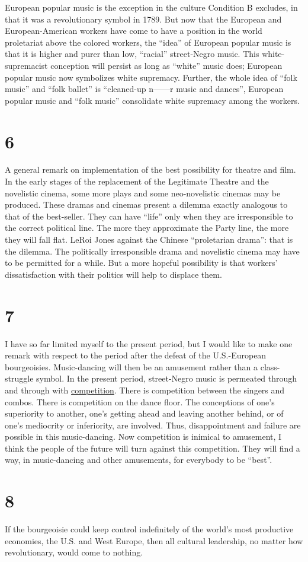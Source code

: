 European popular music is the exception in the culture Condition B excludes, in that it was a revolutionary symbol in 1789. But now that the European and European-American workers have come to have a position in the world proletariat above the colored workers, the \enquote{idea} of European popular music is that it is higher and purer than low, \enquote{racial} street-Negro music. This white-supremacist conception will persist as long as \enquote{white} music does; European popular music now symbolizes white supremacy. Further, the whole idea of \enquote{folk music} and \enquote{folk ballet} is \enquote{cleaned-up n------r music and dances}, European popular music and \enquote{folk music} consolidate white supremacy among the workers. 

\section*{6}
A general remark on implementation of the best possibility for theatre and film. In the early stages of the replacement of the Legitimate Theatre and the novelistic cinema, some more plays and some neo-novelistic cinemas may be produced. These dramas and cinemas present a dilemma exactly analogous to that of the best-seller. They can have \enquote{life} only when they are irresponsible to the correct political line. The more they approximate the Party line, the more they will fall flat. LeRoi Jones against the Chinese \enquote{proletarian drama}: that is the dilemma. The politically irresponsible drama and novelistic cinema may have to be permitted for a while. But a more hopeful possibility is that workers' dissatisfaction with their politics will help to displace them. 

\section*{7}
I have so far limited myself to the present period, but I would like to make one remark with respect to the period after the defeat of the U.S.-European bourgeoisies. Music-dancing will then be an amusement rather than a class-struggle symbol. In the present period, street-Negro music is permeated through and through with \uline{competition}. There is competition between the singers and combos. There is competition on the dance floor. The conceptions of one's superiority to another, one's getting ahead and leaving another behind, or of one's mediocrity or inferiority, are involved. Thus, disappointment and failure are possible in this music-dancing. Now competition is inimical to amusement, I think the people of the future will turn against this competition. They will find a way, in music-dancing and other amusements, for everybody to be \enquote{best}. 

\section*{8}
If the bourgeoisie could keep control indefinitely of the world's most productive economies, the U.S. and West Europe, then all cultural leadership, no matter how revolutionary, would come to nothing.
